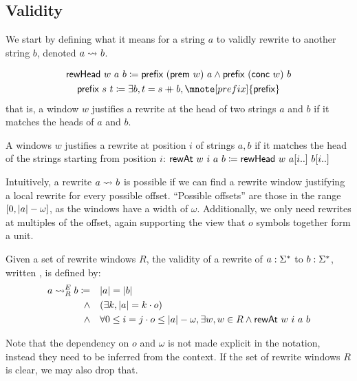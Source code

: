 \subsection{Validity}
We start by defining what it means for a string $a$ to validly rewrite to another string $b$, denoted $a \rightsquigarrow_{} b$.
\begin{definition}\label{def:rewHead}
  \begin{gather*}
    \rewHead{w}{a}{b} \defeq \prefix{(\prem{w})}{a} \land \prefix{(\conc{w})}{b} \\
    \prefix{s}{t} \defeq \exists b, t = s \concat{} b,\mnote[prefix]{\textsf{prefix}}
  \end{gather*}
  that is, a window $w$ justifies a rewrite at the head of two strings $a$ and $b$ if it matches the heads of $a$ and $b$.

  A windows $w$ justifies a rewrite at position $i$ of strings $a, b$ if it matches the head of the strings starting from position $i$:
  $\textsf{rewAt}~w~i~a~b \coloneqq \textsf{rewHead}~w~a[i..]~b[i..]$
\end{definition}

Intuitively, a rewrite $a \rightsquigarrow_{} b$ is possible if we can find a rewrite window justifying a local rewrite for every possible offset. ``Possible offsets'' are those in the range $[0, |a| - \omega]$, as the windows have a width of $\omega$. Additionally, we only need rewrites at multiples of the offset, again supporting the view that $o$ symbols together form a unit.

\begin{definition}
  Given a set of rewrite windows $R$, the validity of a rewrite of $a : \Sigma^*$ to $b : \Sigma^*$, written , is defined by:
  \begin{align*}
    a \rightsquigarrow_{R}^E b \coloneqq \quad& |a| = |b| \\
    \land \quad & (\exists k, |a| = k \cdot o) \\
    \land \quad & \forall 0 \le i = j \cdot o \le |a| - \omega, \exists w, w \in R \land \textsf{rewAt}~w~i~a~b 
  \end{align*}
\end{definition}

Note that the dependency on $o$ and $\omega$ is not made explicit in the notation, instead they need to be inferred from the context. If the set of rewrite windows $R$ is clear, we may also drop that.

